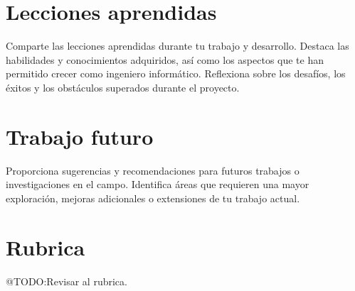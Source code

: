 \section{Lecciones aprendidas}

Comparte las lecciones aprendidas durante tu trabajo y desarrollo.
Destaca las habilidades y conocimientos adquiridos, así como los aspectos que te han permitido crecer como ingeniero
informático.
Reflexiona sobre los desafíos, los éxitos y los obstáculos superados durante el proyecto.


\section{Trabajo futuro}

Proporciona sugerencias y recomendaciones para futuros trabajos o investigaciones en el campo.
Identifica áreas que requieren una mayor exploración, mejoras adicionales o extensiones de tu trabajo actual.


\section{Rubrica}
\colorbox{color_highlight}{@TODO:Revisar al rubrica.}

